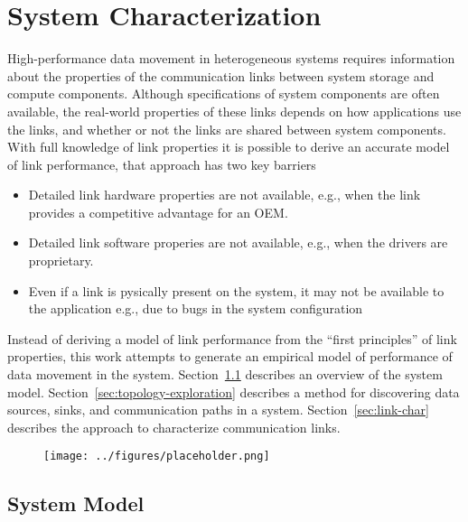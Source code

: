 \chapter{System Characterization}
\label{ch:sys-char}

High-performance data movement in heterogeneous systems requires information about the properties of the communication links between system storage and compute components.
Although specifications of system components are often available, the real-world properties of these links depends on how applications use the links, and whether or not the links are shared between system components.
With full knowledge of link properties it is possible to derive an accurate model of link performance, that approach has two key barriers
\begin{itemize}
    \item Detailed link hardware properties are not available, e.g., when the link provides a competitive advantage for an OEM.
    \item Detailed link software properies are not available, e.g., when the drivers are proprietary.
    \item Even if a link is pysically present on the system, it may not be available to the application {e.g., due to bugs in the system configuration}
\end{itemize}
Instead of deriving a model of link performance from the ``first principles'' of link properties, this work attempts to generate an empirical model of performance of data movement in the system.
Section~\ref{sec:system-model} describes an overview of the system model.
Section~\ref{sec:topology-exploration} describes a method for discovering data sources, sinks, and communication paths in a system.
Section~\ref{sec:link-char} describes the approach to characterize communication links.

\begin{figure}[h]
    \centering
    \caption[]{}
    \centering
      \texttt{[image: ../figures/placeholder.png]}
    \label{fig:actual-perf}
\end{figure}

\section{System Model}
\label{sec:system-model}

